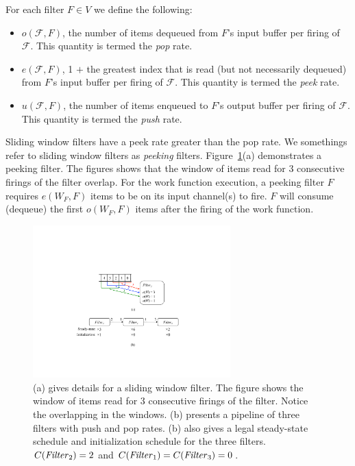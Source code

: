 For each filter $F \in V$ we define the following:
\begin{itemize}

\item $o(\mathcal{F}, F)$, the number of items dequeued from $F$'s
input buffer per firing of $\mathcal{F}$.  This quantity is termed the
{\it pop} rate.

\item $e(\mathcal{F}, F)$, 1 $+$ the greatest index that is read (but
  not necessarily dequeued) from $F$'s input buffer per firing of
  $\mathcal{F}$.  This quantity is termed the {\it peek} rate.

\item $u(\mathcal{F}, F)$, the number of items enqueued to $F$'s
output buffer per firing of $\mathcal{F}$.  This quantity is termed
the {\it push} rate.

\end{itemize}

\noindent Sliding window filters have a peek rate greater than the pop
rate.  We somethings refer to sliding window filters as {\it peeking}
filters. Figure~\ref{fig:pipeline-example}(a)
demonstrates a peeking filter.  The figures shows that the window of
items read for 3 consecutive firings of the filter overlap.  For the
work function execution, a peeking filter $F$ requires $e(W_F, F)$
items to be on its input channel(s) to fire.  $F$ will consume
(dequeue) the first $o(W_F, F)$ items after the firing of the work function.

\begin{figure}[t]
\centering
\includegraphics[width=3.0in]{figures/pipeline-example.pdf}
\caption[A pipeline of three filters with schedules.]{ (a) gives
  details for a sliding window filter.  The figure
  shows the window of items read for 3 consecutive firings of the
  filter.  Notice the overlapping in the windows.  (b) presents a pipeline of
  three filters with push and pop rates.  (b) also gives a
  legal steady-state schedule and initialization schedule for the
  three filters. $C(\relax{\it Filter}_2) = 2$ and
$C(\relax{\it Filter}_1) = C(\relax{\it Filter}_3) = 0$. 
  \label{fig:pipeline-example}}
\vspace{-10pt}
\end{figure}

